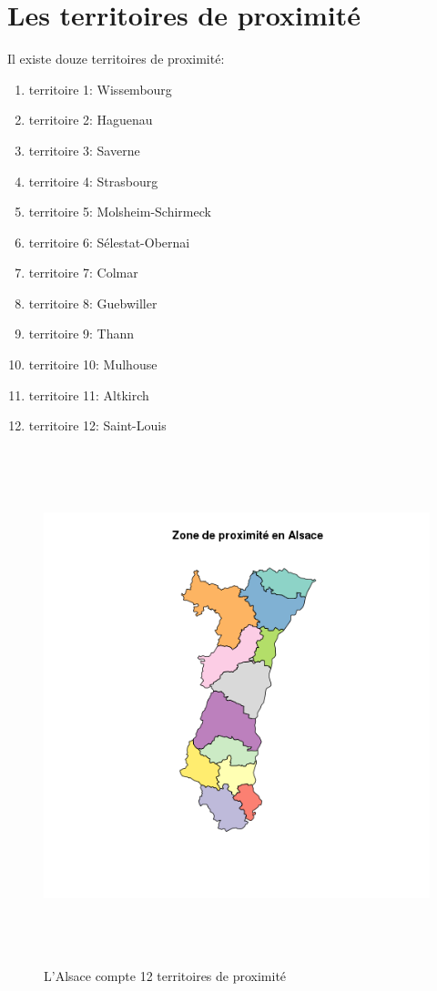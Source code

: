 \documentclass[12pt,english,french,twoside]{report}\usepackage[]{graphicx}\usepackage[]{color}
\begin{document}
\section{Les territoires de proximité}

Il existe douze territoires de proximité:
\begin{enumerate}
  \item territoire 1: Wissembourg
  \item territoire 2: Haguenau
  \item territoire 3: Saverne
  \item territoire 4: Strasbourg
  \item territoire 5: Molsheim-Schirmeck
  \item territoire 6: Sélestat-Obernai
  \item territoire 7: Colmar
  \item territoire 8: Guebwiller
  \item territoire 9: Thann
  \item territoire 10: Mulhouse
  \item territoire 11: Altkirch
  \item territoire 12: Saint-Louis
\end{enumerate}

\begin{figure}[ht]
 \centering
 \includegraphics[height=15cm,keepaspectratio=true]{../figure/zone_proximite.png}
 \caption{L'Alsace compte 12 territoires de proximité}
 \label{fig:zp}
\end{figure}
\end{document}
